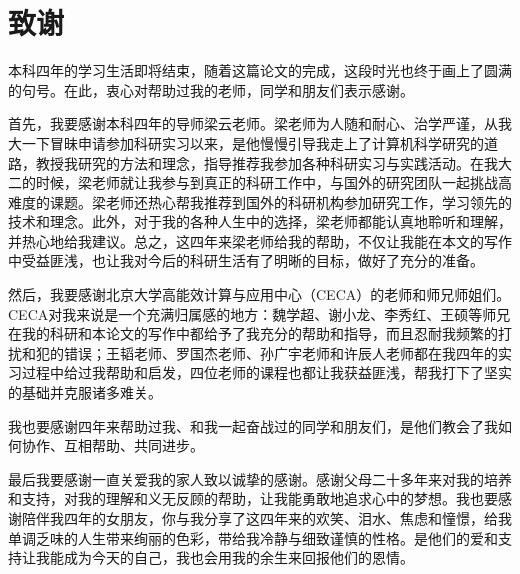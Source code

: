
\chapter{致谢}

本科四年的学习生活即将结束，随着这篇论文的完成，这段时光也终于画上了圆满的句号。在此，衷心对帮助过我的老师，同学和朋友们表示感谢。

首先，我要感谢本科四年的导师梁云老师。梁老师为人随和耐心、治学严谨，从我大一下冒昧申请参加科研实习以来，是他慢慢引导我走上了计算机科学研究的道路，教授我研究的方法和理念，指导推荐我参加各种科研实习与实践活动。在我大二的时候，梁老师就让我参与到真正的科研工作中，与国外的研究团队一起挑战高难度的课题。梁老师还热心帮我推荐到国外的科研机构参加研究工作，学习领先的技术和理念。此外，对于我的各种人生中的选择，梁老师都能认真地聆听和理解，并热心地给我建议。总之，这四年来梁老师给我的帮助，不仅让我能在本文的写作中受益匪浅，也让我对今后的科研生活有了明晰的目标，做好了充分的准备。

然后，我要感谢北京大学高能效计算与应用中心（CECA）的老师和师兄师姐们。CECA对我来说是一个充满归属感的地方：魏学超、谢小龙、李秀红、王硕等师兄在我的科研和本论文的写作中都给予了我充分的帮助和指导，而且忍耐我频繁的打扰和犯的错误；王韬老师、罗国杰老师、孙广宇老师和许辰人老师都在我四年的实习过程中给过我帮助和启发，四位老师的课程也都让我获益匪浅，帮我打下了坚实的基础并克服诸多难关。

我也要感谢四年来帮助过我、和我一起奋战过的同学和朋友们，是他们教会了我如何协作、互相帮助、共同进步。

最后我要感谢一直关爱我的家人致以诚挚的感谢。感谢父母二十多年来对我的培养和支持，对我的理解和义无反顾的帮助，让我能勇敢地追求心中的梦想。我也要感谢陪伴我四年的女朋友，你与我分享了这四年来的欢笑、泪水、焦虑和憧憬，给我单调乏味的人生带来绚丽的色彩，带给我冷静与细致谨慎的性格。是他们的爱和支持让我能成为今天的自己，我也会用我的余生来回报他们的恩情。

